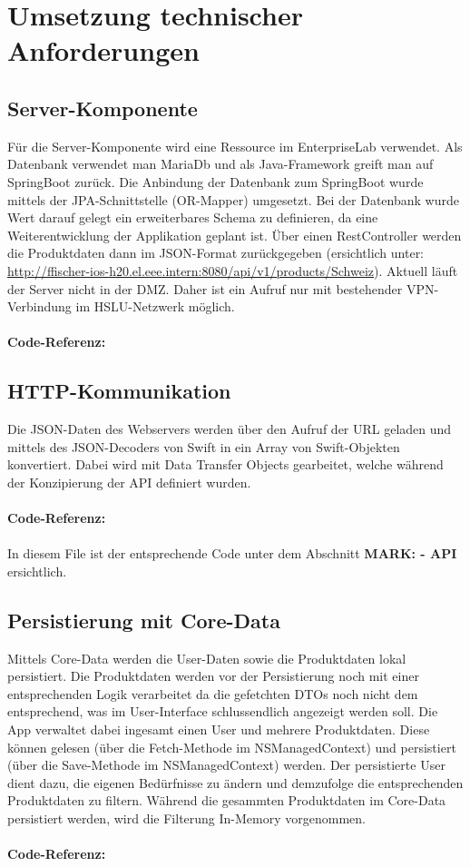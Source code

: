 \documentclass[12pt,titlepage]{article}
\begin{document}
\section{Umsetzung technischer Anforderungen}
\subsection{Server-Komponente}
Für die Server-Komponente wird eine Ressource im EnterpriseLab verwendet. Als Datenbank verwendet man MariaDb und als Java-Framework greift man auf SpringBoot zurück. Die Anbindung der Datenbank zum SpringBoot wurde mittels der JPA-Schnittstelle (OR-Mapper) umgesetzt. Bei der Datenbank wurde Wert darauf gelegt ein erweiterbares Schema zu definieren, da eine Weiterentwicklung der Applikation geplant ist. Über einen RestController werden die Produktdaten dann im JSON-Format zurückgegeben (ersichtlich unter: \url{http://ffischer-ios-h20.el.eee.intern:8080/api/v1/products/Schweiz}). Aktuell läuft der Server nicht in der DMZ. Daher ist ein Aufruf nur mit bestehender VPN-Verbindung im HSLU-Netzwerk möglich.\\
\\
\textbf{Code-Referenz: }

\subsection{HTTP-Kommunikation}
Die JSON-Daten des Webservers werden über den Aufruf der  URL geladen und mittels des JSON-Decoders von Swift in ein Array von Swift-Objekten konvertiert. Dabei wird mit Data Transfer Objects gearbeitet, welche während der Konzipierung der API definiert wurden.\\
\\
\textbf{Code-Referenz: }\\  \\ In diesem File ist der entsprechende Code unter dem Abschnitt \textbf{\glqq MARK: - API\grqq\,} ersichtlich.

\subsection{Persistierung mit Core-Data}
Mittels Core-Data werden die User-Daten sowie die Produktdaten lokal persistiert. Die Produktdaten werden vor der Persistierung noch mit einer entsprechenden Logik verarbeitet da die gefetchten DTOs noch nicht dem entsprechend, was im User-Interface schlussendlich angezeigt werden soll. Die App verwaltet dabei ingesamt einen User und mehrere Produktdaten. Diese können gelesen (über die Fetch-Methode im NSManagedContext) und persistiert (über die Save-Methode im NSManagedContext) werden. Der persistierte User dient dazu, die eigenen Bedürfnisse zu ändern und demzufolge die entsprechenden Produktdaten zu filtern. Während die gesammten Produktdaten im Core-Data persistiert werden, wird die Filterung In-Memory vorgenommen.\\
\\
\textbf{Code-Referenz: }\\ 
\end{document}
